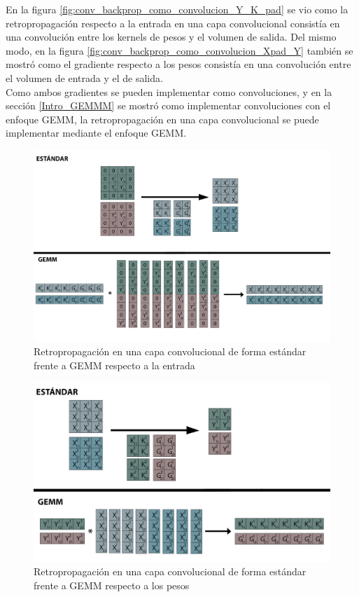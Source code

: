 En la figura \ref{fig:conv_backprop_como_convolucion_Y_K_pad} se vio como la retropropagación respecto a la entrada en una capa convolucional consistía en una convolución entre los kernels de pesos y el volumen de salida. Del mismo modo, en la figura \ref{fig:conv_backprop_como_convolucion_Xpad_Y} también se mostró como el gradiente respecto a los pesos consistía en una convolución entre el volumen de entrada y el de salida. \\
Como ambos gradientes se pueden implementar como convoluciones, y en la sección \ref{Intro_GEMMM} se mostró como implementar convoluciones con el enfoque GEMM, la retropropagación en una capa convolucional se puede implementar mediante el enfoque GEMM.

\begin{figure}[H]
	\hspace{-25mm}
	\includegraphics[scale=0.3]{imagenes/conv_std_vs_gemm_backprop.jpg}  
	\caption{Retropropagación en una capa convolucional de forma estándar frente a GEMM respecto a la entrada}
	\label{fig:conv_std_vs_gemm_backprop}
\end{figure}

\begin{figure}[H]
	\hspace{-25mm}
	\includegraphics[scale=0.3]{imagenes/conv_std_vs_gemm_backprop_pesos.jpg}  
	\caption{Retropropagación en una capa convolucional de forma estándar frente a GEMM respecto a los pesos}
	\label{fig:conv_std_vs_gemm_backprop_pesos}
\end{figure}

